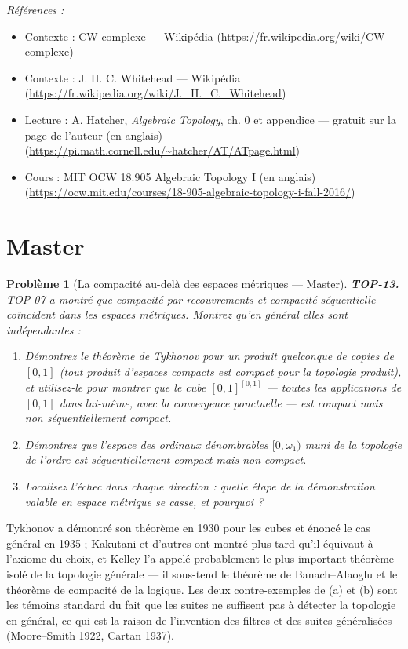 \documentclass[11pt]{article}
\newtheorem{problem}{Problème}
\newenvironment{refs}{\par\small\noindent\emph{Références :}\begin{itemize}\setlength\itemsep{0pt}}{\end{itemize}\normalsize}
\begin{document}
\begin{refs}
\item Contexte : CW-complexe --- Wikipédia (\url{https://fr.wikipedia.org/wiki/CW-complexe})
\item Contexte : J. H. C. Whitehead --- Wikipédia (\url{https://fr.wikipedia.org/wiki/J._H._C._Whitehead})
\item Lecture : A. Hatcher, \textit{Algebraic Topology}, ch. 0 et appendice --- gratuit sur la page de l'auteur (en anglais) (\url{https://pi.math.cornell.edu/~hatcher/AT/ATpage.html})
\item Cours : MIT OCW 18.905 Algebraic Topology I (en anglais) (\url{https://ocw.mit.edu/courses/18-905-algebraic-topology-i-fall-2016/})
\end{refs}

\bigskip


\section*{Master}

\begin{problem}[{La compacité au-delà des espaces métriques --- Master}]
\textbf{TOP-13.} TOP-07 a montré que compacité par recouvrements et compacité séquentielle
coïncident dans les espaces métriques. Montrez qu'en général elles sont indépendantes :
\begin{enumerate}
\item[(a)] Démontrez le théorème de Tykhonov pour un produit quelconque de copies de $ [0,1] $ (tout produit
d'espaces compacts est compact pour la topologie produit), et utilisez-le pour montrer que le cube
$ [0,1]^{[0,1]} $ --- toutes les applications de $ [0,1] $ dans lui-même, avec la convergence
ponctuelle --- est compact mais \textit{non} séquentiellement compact.
\item[(b)] Démontrez que l'espace des ordinaux dénombrables $ [0, \omega_1) $ muni de la topologie de
l'ordre est séquentiellement compact mais non compact.
\item[(c)] Localisez l'échec dans chaque direction : quelle étape de la démonstration valable en espace
métrique se casse, et pourquoi ?
\end{enumerate}

\end{problem}

\noindent Tykhonov a démontré son théorème en 1930 pour les cubes et énoncé le cas général en
1935 ; Kakutani et d'autres ont montré plus tard qu'il équivaut à l'axiome du choix, et Kelley l'a appelé
\og{} probablement le plus important théorème isolé de la topologie générale \fg{} --- il sous-tend le théorème de
Banach--Alaoglu et le théorème de compacité de la logique. Les deux contre-exemples de (a) et (b) sont les
témoins standard du fait que les suites ne suffisent pas à détecter la topologie en général, ce qui est la
raison de l'invention des filtres et des suites généralisées (Moore--Smith 1922, Cartan 1937).
\end{document}
